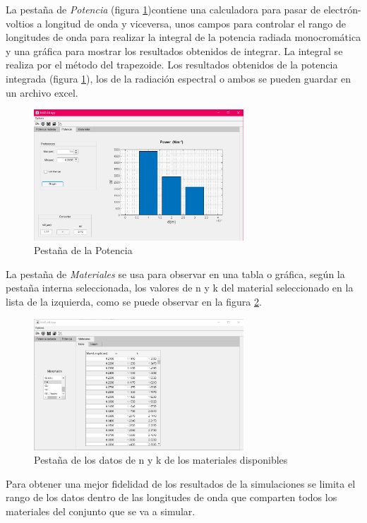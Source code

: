 La pestaña de \textit{Potencia} (figura \ref{fig:pestana_Potencia})contiene una calculadora para pasar de electrón-voltios a longitud de onda y viceversa, unos campos para controlar el rango de longitudes de onda para realizar la integral de la potencia radiada monocromática y una gráfica para mostrar los resultados obtenidos de integrar. La integral se realiza por el método del trapezoide. Los resultados obtenidos de la potencia integrada (figura \ref{fig:pestana_Potencia}), los de la radiación espectral o ambos se pueden guardar en un archivo excel.
\begin{figure}[H]
	\centering
		\includegraphics[width=0.70\textwidth]{figuras/pestana_Potencia.png}
	\caption{Pestaña de la Potencia}
	\label{fig:pestana_Potencia}
\end{figure}
La pestaña de \textit{Materiales} se usa para observar en una tabla o gráfica, según la pestaña interna seleccionada, los valores de n y k del material seleccionado en la lista de la izquierda, como se puede observar en la figura \ref{fig:pestana_materiales}.
\begin{figure}[H]
	\centering
		\includegraphics[width=0.70\textwidth]{figuras/pestana_materiales.png}
	\caption{Pestaña de los datos de n y k  de los materiales disponibles}
	\label{fig:pestana_materiales}
\end{figure}
Para obtener una mejor fidelidad de los resultados de la simulaciones se limita el rango de los datos dentro de las longitudes de onda que comparten todos los materiales del conjunto que se va a simular.